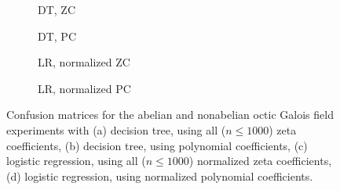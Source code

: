 \documentclass[letterpaper, 10pt]{article}
\newcommand{\1}{\mathds{1}}	%
\theoremstyle{definition}
\theoremstyle{remark}
\begin{document}
\begin{figure}[H]
    \centering
    \begin{subfigure}[t]{0.23\textwidth}
        \centering
        \caption{DT, ZC}
        \label{fig:octic_ab_nab_dt_zc}
    \end{subfigure}
    \hfill
    \begin{subfigure}[t]{0.23\textwidth}
        \centering
        \caption{DT, PC}
        \label{fig:octic_ab_nab_dt_pc}
    \end{subfigure}
    \hfill
    \begin{subfigure}[t]{0.23\textwidth}
        \centering
        \caption{LR, normalized ZC}
        \label{fig:octic_ab_nab_lr_zc_normalized}
    \end{subfigure}
    \hfill
    \begin{subfigure}[t]{0.23\textwidth}
        \centering
        \caption{LR, normalized PC}
        \label{fig:octic_ab_nab_lr_pc_normalized}
    \end{subfigure}
    \caption{Confusion matrices for the abelian and nonabelian octic Galois field experiments with (a) decision tree, using all ($n \le 1000$) zeta coefficients, (b) decision tree, using polynomial coefficients, (c) logistic regression, using all ($n \le 1000$) normalized zeta coefficients, (d) logistic regression, using normalized polynomial coefficients.}
    \label{fig:galois_8_ab_nab_cm}
\end{figure}
\end{document}
